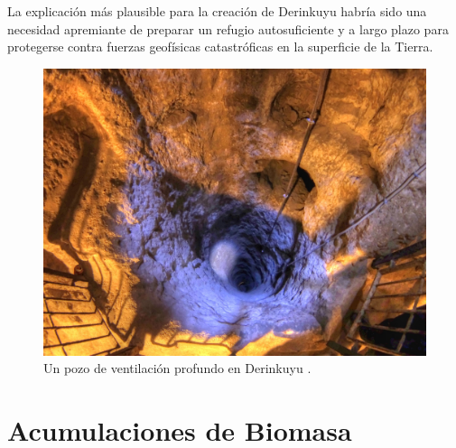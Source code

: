 \documentclass[10pt,twocolumn,letterpaper]{article}
\begin{document}
La explicación más plausible para la creación de Derinkuyu habría sido una necesidad apremiante de preparar un refugio autosuficiente y a largo plazo para protegerse contra fuerzas geofísicas catastróficas en la superficie de la Tierra.

\begin{figure}[t]
\begin{center}
   \includegraphics[width=1\linewidth]{derinkuyu-air.jpg}
\end{center}
   \caption{Un pozo de ventilación profundo en Derinkuyu \cite{53}.}
\label{fig:6}
\label{fig:onecol}
\end{figure}

\section{Acumulaciones de Biomasa}
\end{document}
